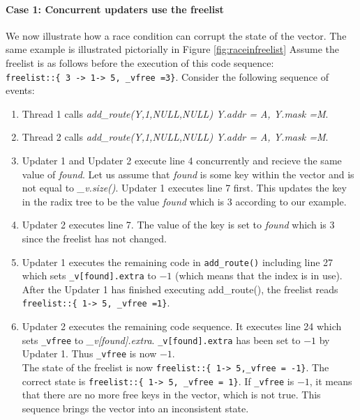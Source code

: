 \documentclass[a4paper,marginparwidth=50pt,marginparsep=10pt]{article}
\begin{document}
\paragraph{Case 1: Concurrent updaters use the freelist}
We now illustrate how a race condition can corrupt the state of the vector. The same example is illustrated pictorially in Figure \ref{fig:raceinfreelist}
Assume the freelist is as follows before the execution of this code sequence:\\
\verb$freelist::{ 3 -> 1-> 5, _vfree =3}$. Consider the following sequence of events:
\begin{enumerate}
\item Thread 1 calls \emph{add\_route(Y,1,NULL,NULL) Y.addr = A, Y.mask =M}.
\item Thread 2 calls \emph{add\_route(Y,1,NULL,NULL) Y.addr = A, Y.mask =M}.
\item Updater 1 and Updater 2 execute line 4 concurrently and recieve the same value of \emph{found}. Let us assume that \emph{found} is some key within the vector and is not equal to \emph{\_v.size()}. Updater 1 executes line 7 first. This updates the key in the radix tree to be the value \emph{found} which is $3$ according to our example.
\item Updater 2 executes line 7. The value of the key is set to \emph{found} which is $3$ since the freelist has not changed.
\item Updater 1 executes the remaining code in \verb+add_route()+ including line 27 which sets  \verb+_v[found].extra+ to $-1$ (which means that the index is in use). After the Updater 1 has finished executing add\_route(), the freelist reads\\
\verb$freelist::{ 1-> 5, _vfree =1}$.
\item Updater 2 executes the remaining code sequence. It executes line 24 which sets \verb+_vfree+ to \emph{\_v[found].extra}. \verb+_v[found].extra+ has been set to $-1$ by Updater 1. Thus \verb+_vfree+ is now $-1$.\\
The state of the freelist is now \verb$freelist::{ 1-> 5,_vfree = -1}$. The correct state is \verb$freelist::{ 1-> 5, _vfree = 1}$. If \verb+_vfree+ is $-1$, it means that there are no more free keys in the vector, which is not true. This sequence brings the vector into an inconsistent state.
\end{enumerate}
\end{document}
